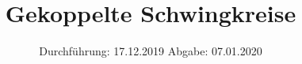 

\subject{Versuch Nr. 355}
\title{Gekoppelte Schwingkreise}
\date{%
  Durchführung: 17.12.2019
  \hspace{3em}
  Abgabe: 07.01.2020
}


\setlength{\parindent}{0pt} %

\maketitle
\thispagestyle{empty}
\tableofcontents
\newpage



%




\nocite{*} %
\printbibliography{}


